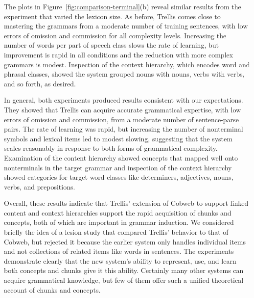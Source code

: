 \documentclass[11pt,letterpaper]{article}
\def\trellis/{{\sc Trellis}}
\begin{document}

The plots in Figure~\ref{fig:comparison-terminal}(b) reveal similar
results from the experiment that varied the lexicon size. As
before, \trellis/ comes close to mastering the grammars from
a moderate number of training sentences, with low errors of
omission and commission for all complexity levels. Increasing
the number of words per part of speech class slows the rate of
learning, but improvement is rapid in all conditions and the
reduction with more complex grammars is modest. Inspection of
the context hierarchy, which encodes word and phrasal classes, 
showed the system grouped nouns with nouns, verbs with verbs, 
and so forth, as desired.



In general, both experiments produced results consistent with our
expectations. They showed that \trellis/ can acquire accurate
grammatical expertise, with low errors of omission and commission,
from a moderate number of sentence-parse pairs. The rate of learning
was rapid, but increasing the number of nonterminal symbols and
lexical items led to modest slowing, suggesting that the system
scales reasonably in response to both forms of grammatical complexity.
Examination of the content hierarchy showed concepts that mapped well
onto nonterminals in the target grammar and inspection of the context
hierarchy showed categories for target word classes like determiners,
adjectives, nouns, verbs, and prepositions. 

Overall, these results indicate that \trellis/' extension of Cobweb
to support linked content and context hierarchies support the rapid
acquisition of chunks and concepts, both of which are important
in grammar induction. We considered briefly the idea of a lesion study
that compared \trellis/' behavior to that of Cobweb, but rejected it
because the earlier system only handles individual items and not
collections of related items like words in sentences. The experiments
demonstrate clearly that the new system's ability to represent, use,
and learn both concepts and chunks give it this ability. Certainly
many other systems can acquire grammatical knowledge, but few of
them offer such a unified theoretical account of chunks and concepts.
\end{document}
